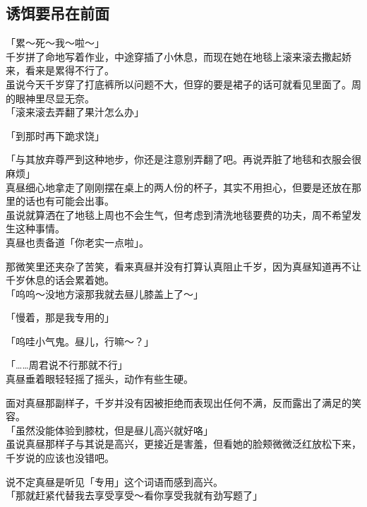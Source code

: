 \subsection{诱饵要吊在前面}

「累～死～我～啦～」\\

千岁拼了命地写着作业，中途穿插了小休息，而现在她在地毯上滚来滚去撒起娇来，看来是累得不行了。\\

虽说今天千岁穿了打底裤所以问题不大，但穿的要是裙子的话可就看见里面了。周的眼神里尽显无奈。\\

「滚来滚去弄翻了果汁怎么办」

「到那时再下跪求饶」

「与其放弃尊严到这种地步，你还是注意别弄翻了吧。再说弄脏了地毯和衣服会很麻烦」\\

真昼细心地拿走了刚刚摆在桌上的两人份的杯子，其实不用担心，但要是还放在那里的话也有可能会出事。\\

虽说就算洒在了地毯上周也不会生气，但考虑到清洗地毯要费的功夫，周不希望发生这种事情。\\

真昼也责备道「你老实一点啦」。

那微笑里还夹杂了苦笑，看来真昼并没有打算认真阻止千岁，因为真昼知道再不让千岁休息的话会累着她。\\

「呜呜～没地方滚那我就去昼儿膝盖上了～」

「慢着，那是我专用的」

「呜哇小气鬼。昼儿，行嘛～？」

「……周君说不行那就不行」\\

真昼垂着眼轻轻摇了摇头，动作有些生硬。

面对真昼那副样子，千岁并没有因被拒绝而表现出任何不满，反而露出了满足的笑容。\\

「虽然没能体验到膝枕，但是昼儿高兴就好咯」\\

虽说真昼那样子与其说是高兴，更接近是害羞，但看她的脸颊微微泛红放松下来，千岁说的应该也没错吧。

说不定真昼是听见「专用」这个词语而感到高兴。\\

「那就赶紧代替我去享受享受～看你享受我就有劲写题了」

